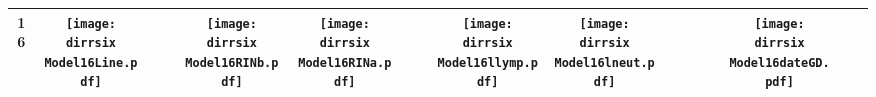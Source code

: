 \documentclass[landscape]{article}
\def \dirrsix{U:/R/RA/Data/Reanalysis Data/resultcbc/Model16.Line.RINb.RINa.llymp.lneut.dateGD/}
\begin{document}
\begin{table}
\begin{tabular}{ccccccccccccccccc}
     
     {\Huge \textbf{16}} 
      &\texttt{[image: \\dirrsix Model16Line.pdf]}
      &
      &
      &\texttt{[image: \\dirrsix Model16RINb.pdf]}
      &\texttt{[image: \\dirrsix Model16RINa.pdf]}
      &
      &
      &\texttt{[image: \\dirrsix Model16llymp.pdf]}
      &\texttt{[image: \\dirrsix Model16lneut.pdf]}
      &
      &
      &
      &
      &\texttt{[image: \\dirrsix Model16dateGD.pdf]}
     \\
     \hline
     
\end{tabular}
\end{table}
\end{document}
